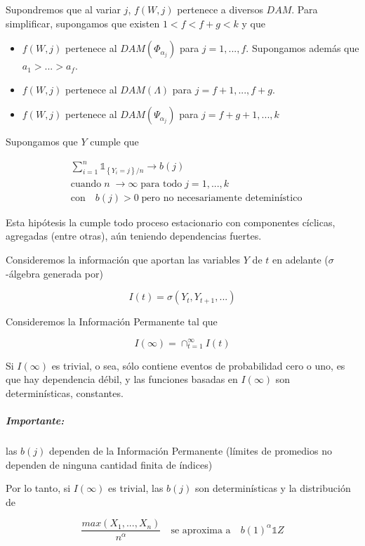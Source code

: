 \documentclass[
  12pt]{article}
\begin{document}
Supondremos que al variar \(j\), \(f(W,j)\) pertenece a diversos
\(DAM\). Para simplificar, supongamos que existen \(1<f< f+g<k\) y que

\begin{itemize}
\item $f(W,j)$ pertenece al $DAM(\Phi_{\alpha_j})$ para $j=1,...,f$. Supongamos además que $a_1 > ... >a_f$.
\item $f(W,j)$ pertenece al $DAM(\Lambda)$ para $j=f+1,...,f+g$.
\item $f(W,j)$ pertenece al $DAM(\Psi_{\alpha_j})$ para $j=f+g+1,...,k$
\end{itemize}

Supongamos que \(Y\) cumple que

\begin{align}
&\sum_{i=1}^{n} \mathbb{1} _{\left\{ Y_i=j  \right\}/n} \longrightarrow b(j) \\
&\text{cuando}\;n\;\longrightarrow \infty \;\text{para todo}\;j=1,...,k \nonumber \\ 
&\text{con}\quad b(j)>0\;\text{pero no necesariamente deteminístico}\nonumber 
\end{align}

Esta hipótesis la cumple todo proceso estacionario con componentes
cíclicas, agregadas (entre otras), aún teniendo dependencias fuertes.

Consideremos la información que aportan las variables \(Y\) de \(t\) en
adelante (\(\sigma\)-álgebra generada por)

\begin{equation}
I(t)=\sigma(Y_t,Y_{t+1},...)
\end{equation}

Consideremos la Información Permanente tal que

\[
I(\infty)= \cap_{t=1}^{\infty} I(t)
\]

Si \(I(\infty)\) es trivial, o sea, sólo contiene eventos de
probabilidad cero o uno, es que hay dependencia débil, y las funciones
basadas en \(I(\infty)\) son determinísticas, constantes.

\subparagraph{Importante:}\label{importante-1}

las \(b(j)\) dependen de la Información Permanente (límites de promedios
no dependen de ninguna cantidad finita de índices)

Por lo tanto, si \(I(\infty)\) es trivial, las \(b(j)\) son
determinísticas y la distribución de

\[
\frac{max(X_1,...,X_n)}{n^{\alpha}}\quad\text{se aproxima a}\quad b(1)^{\alpha}\mathbb{1}Z
\]
\end{document}
